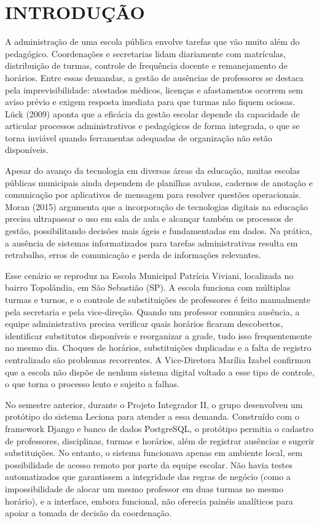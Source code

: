 \chapter{INTRODUÇÃO}

A administração de uma escola pública envolve tarefas que vão muito além do pedagógico. Coordenações e secretarias lidam diariamente com matrículas, distribuição de turmas, controle de frequência docente e remanejamento de horários. Entre essas demandas, a gestão de ausências de professores se destaca pela imprevisibilidade: atestados médicos, licenças e afastamentos ocorrem sem aviso prévio e exigem resposta imediata para que turmas não fiquem ociosas. Lück (2009) aponta que a eficácia da gestão escolar depende da capacidade de articular processos administrativos e pedagógicos de forma integrada, o que se torna inviável quando ferramentas adequadas de organização não estão disponíveis.

Apesar do avanço da tecnologia em diversas áreas da educação, muitas escolas públicas municipais ainda dependem de planilhas avulsas, cadernos de anotação e comunicação por aplicativos de mensagem para resolver questões operacionais. Moran (2015) argumenta que a incorporação de tecnologias digitais na educação precisa ultrapassar o uso em sala de aula e alcançar também os processos de gestão, possibilitando decisões mais ágeis e fundamentadas em dados. Na prática, a ausência de sistemas informatizados para tarefas administrativas resulta em retrabalho, erros de comunicação e perda de informações relevantes.

Esse cenário se reproduz na Escola Municipal Patrícia Viviani, localizada no bairro Topolândia, em São Sebastião (SP). A escola funciona com múltiplas turmas e turnos, e o controle de substituições de professores é feito manualmente pela secretaria e pela vice-direção. Quando um professor comunica ausência, a equipe administrativa precisa verificar quais horários ficaram descobertos, identificar substitutos disponíveis e reorganizar a grade, tudo isso frequentemente no mesmo dia. Choques de horários, substituições duplicadas e a falta de registro centralizado são problemas recorrentes. A Vice-Diretora Marília Izabel confirmou que a escola não dispõe de nenhum sistema digital voltado a esse tipo de controle, o que torna o processo lento e sujeito a falhas.

No semestre anterior, durante o Projeto Integrador II, o grupo desenvolveu um protótipo do sistema Leciona para atender a essa demanda. Construído com o framework Django e banco de dados PostgreSQL, o protótipo permitia o cadastro de professores, disciplinas, turmas e horários, além de registrar ausências e sugerir substituições. No entanto, o sistema funcionava apenas em ambiente local, sem possibilidade de acesso remoto por parte da equipe escolar. Não havia testes automatizados que garantissem a integridade das regras de negócio (como a impossibilidade de alocar um mesmo professor em duas turmas no mesmo horário), e a interface, embora funcional, não oferecia painéis analíticos para apoiar a tomada de decisão da coordenação.


